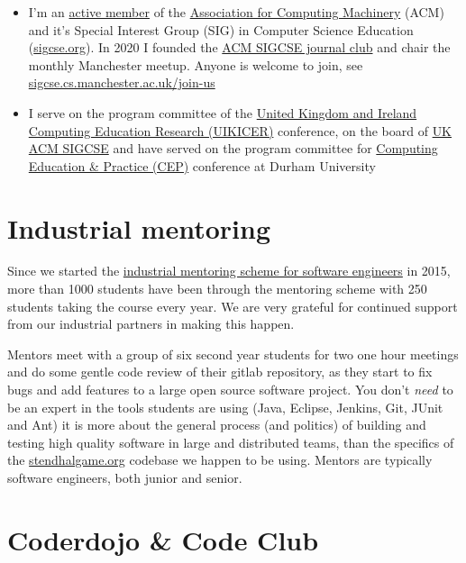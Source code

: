 \documentclass[
  12pt,
]{book}
\providecommand{\tightlist}{%
  \setlength{\itemsep}{0pt}\setlength{\parskip}{0pt}}
\begin{document}
\begin{itemize}
\tightlist
\item
  I'm an \href{https://dl.acm.org/profile/81350580198}{active member} of the \href{https://en.wikipedia.org/wiki/Association_for_Computing_Machinery}{Association for Computing Machinery} (ACM) and it's Special Interest Group (SIG) in Computer Science Education (\href{https://sigcse.org}{sigcse.org}). In 2020 I founded the \href{https://sigcse.cs.manchester.ac.uk/}{ACM SIGCSE journal club} and chair the monthly Manchester meetup. Anyone is welcome to join, see \href{https://sigcse.cs.manchester.ac.uk/join-us}{sigcse.cs.manchester.ac.uk/join-us}
\item
  I serve on the program committee of the \href{https://www.ukicer.com/}{United Kingdom and Ireland Computing Education Research (UIKICER)} conference, on the board of \href{https://uki-sigcse.acm.org/about}{UK ACM SIGCSE} and have served on the program committee for \href{http://community.dur.ac.uk/cep.conference}{Computing Education \& Practice (CEP)} conference at Durham University
\end{itemize}

\hypertarget{industrial-mentoring}{%
\section{Industrial mentoring}\label{industrial-mentoring}}

Since we started the \href{https://www.cs.manchester.ac.uk/connect/business-engagement/industrial-mentoring/}{industrial mentoring scheme for software engineers} in 2015, more than 1000 students have been through the mentoring scheme with 250 students taking the course every year. We are very grateful for continued support from our industrial partners in making this happen.

Mentors meet with a group of six second year students for two one hour meetings and do some gentle code review of their gitlab repository, as they start to fix bugs and add features to a large open source software project. You don't \emph{need} to be an expert in the tools students are using (Java, Eclipse, Jenkins, Git, JUnit and Ant) it is more about the general process (and politics) of building and testing high quality software in large and distributed teams, than the specifics of the \href{https://stendhalgame.org/}{stendhalgame.org} codebase we happen to be using. Mentors are typically software engineers, both junior and senior.

\hypertarget{codeclub}{%
\section{Coderdojo \& Code Club}\label{codeclub}}
\end{document}
